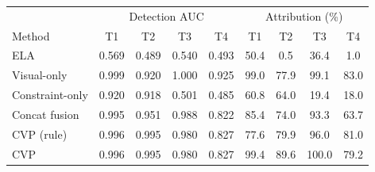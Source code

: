 \begin{tabular}{lcccc|cccc}
\toprule
 & \multicolumn{4}{c|}{Detection AUC} & \multicolumn{4}{c}{Attribution (\%)}\\
Method & T1 & T2 & T3 & T4 & T1 & T2 & T3 & T4\\
\midrule
ELA & 0.569 & 0.489 & 0.540 & 0.493 & 50.4 & 0.5 & 36.4 & 1.0\\
Visual-only & 0.999 & 0.920 & 1.000 & 0.925 & 99.0 & 77.9 & 99.1 & 83.0\\
Constraint-only & 0.920 & 0.918 & 0.501 & 0.485 & 60.8 & 64.0 & 19.4 & 18.0\\
Concat fusion & 0.995 & 0.951 & 0.988 & 0.822 & 85.4 & 74.0 & 93.3 & 63.7\\
CVP (rule) & 0.996 & 0.995 & 0.980 & 0.827 & 77.6 & 79.9 & 96.0 & 81.0\\
CVP & 0.996 & 0.995 & 0.980 & 0.827 & 99.4 & 89.6 & 100.0 & 79.2\\
\bottomrule
\end{tabular}
